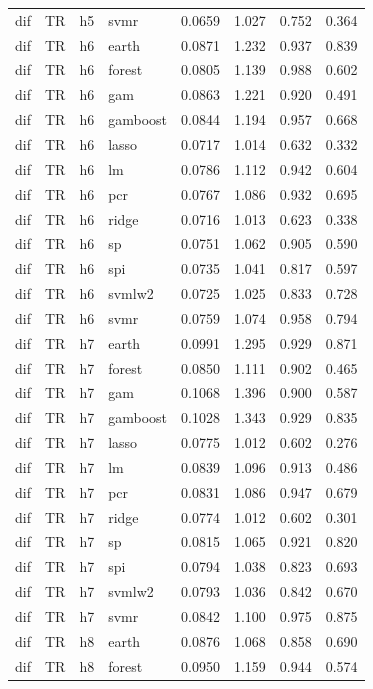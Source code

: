 \begin{ThreePartTable}
\begin{longtable}[t]{llclcccc}
dif & TR & h5 & svmr & 0.0659 & 1.027 & 0.752 & 0.364\\
\addlinespace
dif & TR & h6 & earth & 0.0871 & 1.232 & 0.937 & 0.839\\
dif & TR & h6 & forest & 0.0805 & 1.139 & 0.988 & 0.602\\
dif & TR & h6 & gam & 0.0863 & 1.221 & 0.920 & 0.491\\
dif & TR & h6 & gamboost & 0.0844 & 1.194 & 0.957 & 0.668\\
dif & TR & h6 & lasso & 0.0717 & 1.014 & 0.632 & 0.332\\
dif & TR & h6 & lm & 0.0786 & 1.112 & 0.942 & 0.604\\
dif & TR & h6 & pcr & 0.0767 & 1.086 & 0.932 & 0.695\\
dif & TR & h6 & ridge & 0.0716 & 1.013 & 0.623 & 0.338\\
dif & TR & h6 & sp & 0.0751 & 1.062 & 0.905 & 0.590\\
dif & TR & h6 & spi & 0.0735 & 1.041 & 0.817 & 0.597\\
dif & TR & h6 & svmlw2 & 0.0725 & 1.025 & 0.833 & 0.728\\
dif & TR & h6 & svmr & 0.0759 & 1.074 & 0.958 & 0.794\\
\addlinespace
dif & TR & h7 & earth & 0.0991 & 1.295 & 0.929 & 0.871\\
dif & TR & h7 & forest & 0.0850 & 1.111 & 0.902 & 0.465\\
dif & TR & h7 & gam & 0.1068 & 1.396 & 0.900 & 0.587\\
dif & TR & h7 & gamboost & 0.1028 & 1.343 & 0.929 & 0.835\\
dif & TR & h7 & lasso & 0.0775 & 1.012 & 0.602 & 0.276\\
dif & TR & h7 & lm & 0.0839 & 1.096 & 0.913 & 0.486\\
dif & TR & h7 & pcr & 0.0831 & 1.086 & 0.947 & 0.679\\
dif & TR & h7 & ridge & 0.0774 & 1.012 & 0.602 & 0.301\\
dif & TR & h7 & sp & 0.0815 & 1.065 & 0.921 & 0.820\\
dif & TR & h7 & spi & 0.0794 & 1.038 & 0.823 & 0.693\\
dif & TR & h7 & svmlw2 & 0.0793 & 1.036 & 0.842 & 0.670\\
dif & TR & h7 & svmr & 0.0842 & 1.100 & 0.975 & 0.875\\
\addlinespace
dif & TR & h8 & earth & 0.0876 & 1.068 & 0.858 & 0.690\\
dif & TR & h8 & forest & 0.0950 & 1.159 & 0.944 & 0.574\\

\end{longtable}
\end{ThreePartTable}
